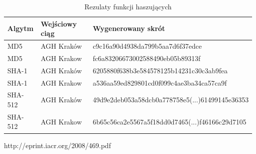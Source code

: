 \begin{table}[H]
    \centering
    \begin{tabular}{|l|l|l|}
    \hline
    Algytm & Wejściowy ciąg & Wygenerowany skrót  \\ \hline
    MD5 & AGH Kraków &    c9c16a90d4938da799b5aa7d6f37edce  \\ \hline
    MD5 & AGH Krakow &    fc6a83206673002588490eb05b89313f  \\ \hline
    SHA-1 & AGH Kraków &  6205880f638b3e584578125b14231c30c3ab9fea  \\ \hline
    SHA-1 & AGH Krakow  & a536aa59ed829801cd0f099c4ae3ba34ca57ca9f \\ \hline
    SHA-512 & AGH Kraków &  49d9e2deb053a58dcb0a778758e5(...)61499145e36353  \\ \hline
    SHA-512 & AGH Krakow  & 6b65c56ca2e5567a5f18dd0d7465(...)f46166c29d7105 \\ \hline
    \end{tabular}
    \caption{Rezulaty funkcji haszujących}
    \label{tab:hashresult}
\end{table}

http://eprint.iacr.org/2008/469.pdf
